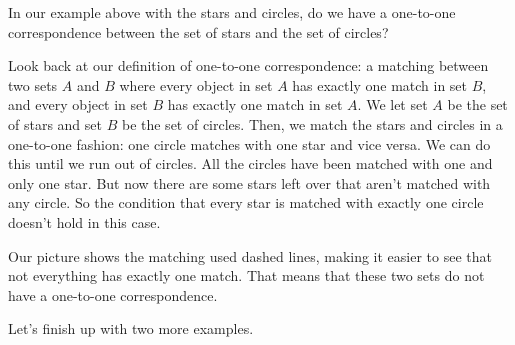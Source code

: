 \documentclass{ximera}
\begin{document}
\begin{question}
In our example above with the stars and circles, do we have a one-to-one correspondence between the set of stars and the set of circles?
\begin{center}
\end{center}
\begin{multipleChoice}
\end{multipleChoice}
\begin{explanation}
	Look back at our definition of one-to-one correspondence: a matching between two sets $A$ and $B$ where every object in set $A$ has exactly one match in set $B$, and every object in set $B$ has exactly one match in set $A$. We let set $A$ be the set of stars and set $B$ be the set of circles. Then, we match the stars and circles in a one-to-one fashion: one circle matches with one star and vice versa. We can do this until we run out of circles. All the circles have been matched with one and only one star. But now there are some stars left over that aren't matched with any circle. So the condition that every star is matched with exactly one circle doesn't hold in this case.
\begin{center}
\end{center}
Our picture shows the matching used dashed lines, making it easier to see that not everything has exactly one match. That means that these two sets do not have a one-to-one correspondence.
\end{explanation}
\end{question}

Let's finish up with two more examples.
\end{document}
